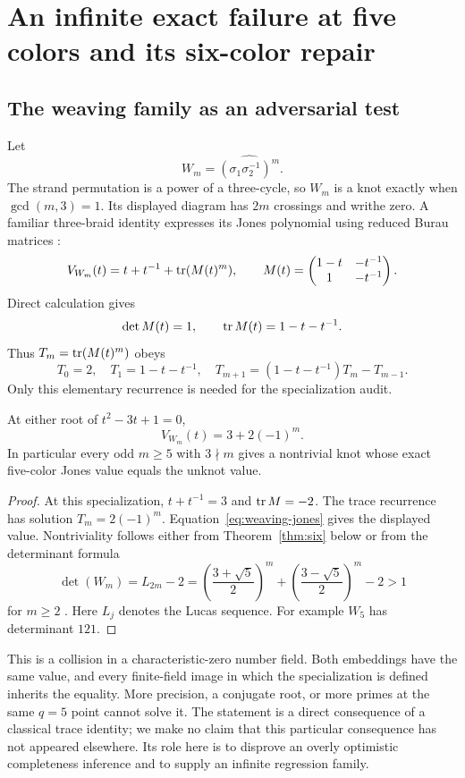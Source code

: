 \section{An infinite exact failure at five colors and its six-color repair}
\label{sec:blind}

\subsection{The weaving family as an adversarial test}

Let
\[
 W_m=\widehat{(\sigma_1\sigma_2^{-1})^m}.
\]
The strand permutation is a power of a three-cycle, so $W_m$ is a knot
exactly when $\gcd(m,3)=1$. Its displayed diagram has $2m$ crossings and
writhe zero. A familiar three-braid identity expresses its Jones polynomial
using reduced Burau matrices \cite{birman1985,alsukaiti2024}:
\begin{equation}
 V_{W_m}(t)=t+t^{-1}+\operatorname{tr}(M(t)^m),\qquad
 M(t)=
 \begin{pmatrix}
  1-t&-t^{-1}\\
  1&-t^{-1}
 \end{pmatrix}.
 \label{eq:weaving-jones}
\end{equation}
Direct calculation gives
\[
 \det M(t)=1,\qquad \operatorname{tr} M(t)=1-t-t^{-1}.
\]
Thus $T_m=\operatorname{tr}(M(t)^m)$ obeys
\[
 T_0=2,\quad T_1=1-t-t^{-1},\quad
 T_{m+1}=(1-t-t^{-1})T_m-T_{m-1}.
\]
Only this elementary recurrence is needed for the specialization audit.

\begin{theorem}\label{thm:blind}
At either root of $t^2-3t+1=0$,
\[
 V_{W_m}(t)=3+2(-1)^m.
\]
In particular every odd $m\ge5$ with $3\nmid m$ gives a nontrivial knot
whose exact five-color Jones value equals the unknot value.
\end{theorem}
\begin{proof}
At this specialization, $t+t^{-1}=3$ and $\operatorname{tr} M=-2$.
The trace recurrence has solution $T_m=2(-1)^m$.
Equation~\eqref{eq:weaving-jones} gives the displayed value.
Nontriviality follows either from Theorem~\ref{thm:six} below or from
the determinant formula
\[
 \det(W_m)=L_{2m}-2
   =\left(\frac{3+\sqrt5}{2}\right)^m
    +\left(\frac{3-\sqrt5}{2}\right)^m-2>1
\]
for $m\ge2$ \cite{alsukaiti2024}. Here $L_j$ denotes the Lucas sequence.
For example $W_5$ has determinant $121$.
\end{proof}

This is a collision in a characteristic-zero number field. Both embeddings
have the same value, and every finite-field image in which the specialization
is defined inherits the equality. More precision, a conjugate root, or more
primes at the same $q=5$ point cannot solve it.
The statement is a direct consequence of a classical trace identity; we
make no claim that this particular consequence has not appeared elsewhere.
Its role here is to disprove an overly optimistic completeness inference and
to supply an infinite regression family.

